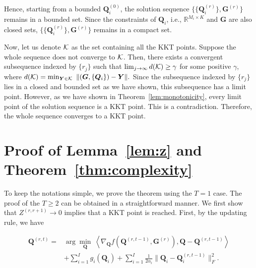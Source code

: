 \documentclass[10pt,journal]{IEEEtran}
\newcommand{\G}{\boldsymbol{G}}
\newcommand{\Q}{\boldsymbol{Q}}
\begin{document}
Hence, starting from a bounded ${\bm Q}_i^{(0)}$, the solution sequence $\{\{{\bm Q}_i^{(r)}\},{\bm G}^{(r)}\}$ remains in a bounded set. Since the constraints of ${\bm Q}_i$, i.e., $\mathbb{R}^{M_i\times K}$ and ${\bm G}$ are also closed sets,  $\{\{{\bm Q}_i^{(r)}\},{\bm G}^{(r)}\}$ remains in a compact set.

Now, let us denote ${\cal K}$ as the set containing all the KKT points.
Suppose the whole sequence does not converge to ${\cal K}$.
Then, there exists a convergent subsequence indexed by $\{r_j\}$ such that
$\lim_{j\rightarrow \infty} d({\cal K})\geq \gamma$
for some positive $\gamma$, where
$d({\cal K}) = \min_{{\bm Y}\in{\cal K}}~\|({\bm G},\{{\bm Q}_i\}) - {\bm Y}\|.$
Since the subsequence indexed by $\{r_j\}$ lies in a closed and bounded set as we have shown,
this subsequence has a limit point.
However, as we have shown in Theorem~\ref{lem:monotonicity}, every limit point of the solution sequence is a KKT point.
This is a contradiction.
Therefore, the whole sequence converges to a KKT point.

\section{Proof of Lemma~\ref{lem:z} and Theorem~\ref{thm:complexity}}\label{app:complexity}

To keep the notations simple, we prove the theorem using the $T=1$ case.
The proof of the $T\geq 2$ can be obtained in a straightforward manner. 
We first show that $Z^{(r,r+1)}\rightarrow 0$ implies that a KKT point is reached.
First, by the updating rule, we have

\begin{align}
\Q^{(r,t)} = &\arg\min_{\Q}~ \left<\nabla_{\Q}f(\Q^{(r,t-1)},\G^{(r)}),\Q -\Q^{(r,t-1)}\right> \nonumber\\
     & + \sum_{i=1}^Ig_i(\Q_i)+\sum_{i=1}^I\frac{1}{2\alpha_i}\|\Q_i-\Q_i^{(r,t-1)}\|_F^2.  \label{eq:q_arg}
\end{align}
\end{document}
